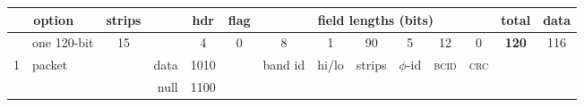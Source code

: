 \begin{table}[htbp]
  \centering
  \small
    \tabcolsep=0.11cm
    \begin{tabular}{llrrrrrrrrrrrr}
    \toprule
    \multicolumn{2}{c}{\textbf{option}} & \textbf{strips} &       & \multicolumn{1}{c}{\textbf{hdr}} & \multicolumn{1}{c}{\textbf{flag}} & \multicolumn{6}{c}{\textbf{ field lengths (bits)}} & \multicolumn{1}{c}{\textbf{total}} & \multicolumn{1}{c}{\textbf{data}} \\
    \midrule
          & one 120-bit & \multicolumn{1}{c}{15} & \multicolumn{1}{l}{} & \multicolumn{1}{c}{4} & \multicolumn{1}{c}{0} & \multicolumn{1}{c}{8} & \multicolumn{1}{c}{1} & \multicolumn{1}{c}{90} & \multicolumn{1}{c}{5} & \multicolumn{1}{c}{12} & \multicolumn{1}{c}{0} & \multicolumn{1}{c}{\textbf{120}} & \multicolumn{1}{c}{116} \\
    1     & packet & \multicolumn{1}{c}{} & data  & \multicolumn{1}{c}{1010} & \multicolumn{1}{c}{} & \multicolumn{1}{c}{band id} & \multicolumn{1}{c}{hi/lo} & \multicolumn{1}{c}{strips} & \multicolumn{1}{c}{$\phi$-id} & \multicolumn{1}{c}{\textsc{bcid}} & \multicolumn{1}{c}{\textsc{crc}} & \multicolumn{1}{c}{\textbf{}} & \multicolumn{1}{c}{} \\
          &       &       & null  & \multicolumn{1}{c}{1100} & \multicolumn{1}{c}{} & \multicolumn{1}{c}{} & \multicolumn{1}{c}{} & \multicolumn{1}{c}{} & \multicolumn{1}{c}{} & \multicolumn{1}{c}{} & \multicolumn{1}{c}{} & \multicolumn{1}{c}{} & \multicolumn{1}{c}{} \\

\end{tabular}
\end{table}
